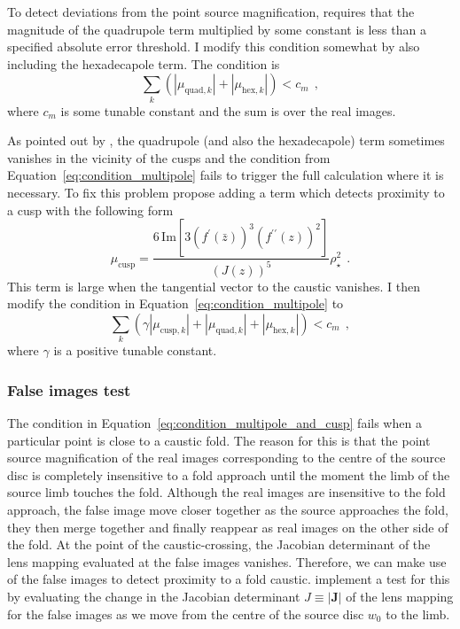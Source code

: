 \documentclass[12pt,dvipsnames]{report}
\renewcommand{\vec}[1]{\boldsymbol{\mathbf{#1}}}
\newcommand{\hquad}{~~}
\begin{document}
To detect deviations from the point source magnification, 
\citet{2018MNRAS.479.5157B} requires that the magnitude of the quadrupole term multiplied 
by some constant is less than a specified absolute error threshold. I modify this condition
somewhat by also including the hexadecapole term. The condition is  
\begin{equation}
    \sum_k\left(|\mu_{\mathrm{quad},k}| + |\mu_{\mathrm{hex},k}| \right)<c_m
    \hquad,
    \label{eq:condition_multipole}
\end{equation}
where $c_m$ is some tunable constant and the sum is over the real images.

As pointed out by \citet{2017MNRAS.468.3993C}, the quadrupole (and also the hexadecapole) 
term sometimes vanishes in the vicinity of the cusps and the condition from  
Equation~\ref{eq:condition_multipole} fails to trigger the full calculation where it is 
necessary. To fix this problem \citet{2017MNRAS.468.3993C} propose adding a term which
detects proximity to a cusp with the following form
\begin{equation}
\mu_\mathrm{cusp}=\frac{6\,\mathrm{Im}\left[3 (f^{\prime }(\bar{z}))^3 (f^{\prime \prime }(z))^2\right]}{(J(z))^5} \rho_\star^{2}
\hquad.
\end{equation}
This term is large when the tangential vector to the caustic vanishes.
I then modify the condition in Equation~\ref{eq:condition_multipole} to 
\begin{equation}
    \sum_k\left(\gamma|\mu_{\mathrm{cusp},k}| + |\mu_{\mathrm{quad},k}| + |\mu_{\mathrm{hex},k}| \right)<c_m
    \hquad,
    \label{eq:condition_multipole_and_cusp}
\end{equation}
where $\gamma$ is a positive tunable constant.

\subsubsection{False images test}
The condition in Equation~\ref{eq:condition_multipole_and_cusp}
fails when a particular point is close to a caustic fold. 
The reason for this is that the point source magnification of the real images corresponding 
to the centre of the source disc is completely insensitive to a fold approach until the 
moment the limb of the source limb touches the fold. Although the real images
are insensitive to the fold approach, the false image move closer together as the source 
approaches the fold, they then merge together and finally reappear as real images on the 
other side of the fold. At the point of the caustic-crossing, the Jacobian determinant of 
the lens mapping evaluated at the false images vanishes.
Therefore, we can make use of the false images to detect proximity to a fold caustic. 
\citet{2018MNRAS.479.5157B} implement a test for this by evaluating the change in the 
Jacobian determinant $J\equiv|\vec J|$ of the lens mapping for the false images as
we move from the centre of the source disc $w_0$ to the limb. 
\end{document}
